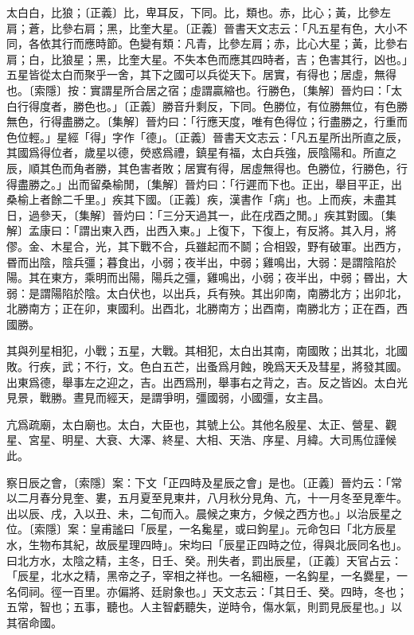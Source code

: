 太白白，比狼；〔正義〕比，卑耳反，下同。比，類也。赤，比心；黃，比參左肩；蒼，比參右肩；黑，比奎大星。〔正義〕晉書天文志云：「凡五星有色，大小不同，各依其行而應時節。色變有類：凡青，比參左肩；赤，比心大星；黃，比參右肩；白，比狼星；黑，比奎大星。不失本色而應其四時者，吉；色害其行，凶也。」五星皆從太白而聚乎一舍，其下之國可以兵從天下。居實，有得也；居虛，無得也。〔索隱〕按：實謂星所合居之宿；虛謂贏縮也。行勝色，〔集解〕晉灼曰：「太白行得度者，勝色也。」〔正義〕勝音升剩反，下同。色勝位，有位勝無位，有色勝無色，行得盡勝之。〔集解〕晉灼曰：「行應天度，唯有色得位；行盡勝之，行重而色位輕。」星經「得」字作「德」。〔正義〕晉書天文志云：「凡五星所出所直之辰，其國爲得位者，歲星以德，熒惑爲禮，鎮星有福，太白兵強，辰陰陽和。所直之辰，順其色而角者勝，其色害者敗；居實有得，居虛無得也。色勝位，行勝色，行得盡勝之。」出而留桑榆閒，〔集解〕晉灼曰：「行遲而下也。正出，舉目平正，出桑榆上者餘二千里。」疾其下國。〔正義〕疾，漢書作「病」也。上而疾，未盡其日，過參天，〔集解〕晉灼曰：「三分天過其一，此在戌酉之閒。」疾其對國。〔集解〕孟康曰：「謂出東入西，出西入東。」上復下，下復上，有反將。其入月，將僇。金、木星合，光，其下戰不合，兵雖起而不鬬；合相毀，野有破軍。出西方，昬而出陰，陰兵彊；暮食出，小弱；夜半出，中弱；雞鳴出，大弱：是謂陰陷於陽。其在東方，乘明而出陽，陽兵之彊，雞鳴出，小弱；夜半出，中弱；昬出，大弱：是謂陽陷於陰。太白伏也，以出兵，兵有殃。其出卯南，南勝北方；出卯北，北勝南方；正在卯，東國利。出酉北，北勝南方；出酉南，南勝北方；正在酉，西國勝。

其與列星相犯，小戰；五星，大戰。其相犯，太白出其南，南國敗；出其北，北國敗。行疾，武；不行，文。色白五芒，出蚤爲月蝕，晚爲天夭及彗星，將發其國。出東爲德，舉事左之迎之，吉。出西爲刑，舉事右之背之，吉。反之皆凶。太白光見景，戰勝。晝見而經天，是謂爭明，彊國弱，小國彊，女主昌。

亢爲疏廟，太白廟也。太白，大臣也，其號上公。其他名殷星、太正、營星、觀星、宮星、明星、大衰、大澤、終星、大相、天浩、序星、月緯。大司馬位謹候此。

察日辰之會，〔索隱〕案：下文「正四時及星辰之會」是也。〔正義〕晉灼云：「常以二月春分見奎、婁，五月夏至見東井，八月秋分見角、亢，十一月冬至見牽牛。出以辰、戌，入以丑、未，二旬而入。晨候之東方，夕候之西方也。」以治辰星之位。〔索隱〕案：皇甫謐曰「辰星，一名毚星，或曰鉤星」。元命包曰「北方辰星水，生物布其紀，故辰星理四時」。宋均曰「辰星正四時之位，得與北辰同名也」。曰北方水，太陰之精，主冬，日壬、癸。刑失者，罰出辰星，〔正義〕天官占云：「辰星，北水之精，黑帝之子，宰相之祥也。一名細極，一名鈎星，一名爨星，一名伺祠。徑一百里。亦偏將、廷尉象也。」天文志云：「其日壬、癸。四時，冬也；五常，智也；五事，聽也。人主智虧聽失，逆時令，傷水氣，則罰見辰星也。」以其宿命國。

